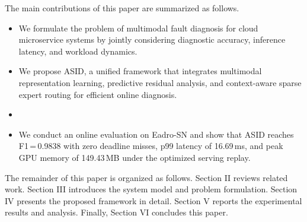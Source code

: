 The main contributions of this paper are summarized as follows.
\begin{itemize}
\item We formulate the problem of  multimodal fault diagnosis for cloud microservice systems by jointly considering diagnostic accuracy, inference latency, and workload dynamics.
\item We propose ASID, a unified framework that integrates multimodal representation learning, predictive residual analysis, and context-aware sparse expert routing for efficient online diagnosis.
\item {}
\item We conduct an online evaluation on Eadro-SN and show that ASID reaches F1\,=\,0.9838 with zero deadline misses, p99 latency of 16.69\,ms, and peak GPU memory of 149.43\,MB under the optimized serving replay. 

\end{itemize}

The remainder of this paper is organized as follows. Section II reviews related work. Section III introduces the system model and problem formulation. Section IV presents the proposed framework in detail. Section V reports the experimental results and analysis. Finally, Section VI concludes this paper.
